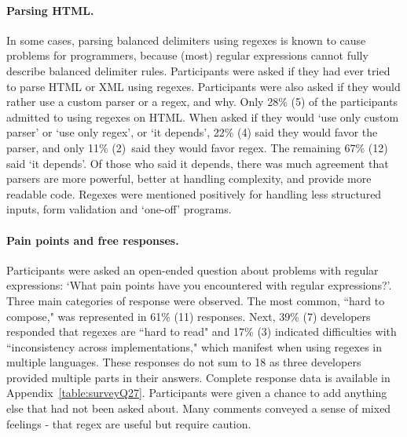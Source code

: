 \paragraph{Parsing HTML.}\label{sec:surveyParsingHTML}   In some cases, parsing balanced delimiters using regexes is known to cause problems for programmers, because (most) regular expressions cannot fully describe balanced delimiter rules. Participants were asked if they had ever tried to parse HTML or XML using regexes.  Participants were also asked if they would rather use a custom parser or a regex, and why.  Only 28\% (5) of the participants admitted to using regexes on HTML.  When asked if they would `use only custom parser' or `use only regex', or `it depends', 22\% (4) said they would favor the parser, and only 11\% (2) said they would favor regex.  The remaining 67\% (12) said `it depends'.  Of those who said it depends, there was much agreement that parsers are more powerful, better at handling complexity, and provide more readable code.  Regexes were mentioned positively for handling less structured inputs, form validation and `one-off' programs.

\paragraph{Pain points and free responses.}\label{sec:painPoints}
Participants were asked an open-ended question about problems with regular expressions: `What pain points have you encountered with regular expressions?'.  Three main categories of response were observed. The most common, ``hard to compose," was represented in 61\% (11) responses. Next, 39\% (7) developers responded that regexes are ``hard to read" and 17\% (3) indicated difficulties with ``inconsistency across implementations," which manifest when using regexes in multiple languages. These responses do not sum to 18 as three developers provided multiple parts in their answers.  Complete response data is available in Appendix~\ref{table:surveyQ27}.  Participants were given a chance to add anything else that had not been asked about.  Many comments conveyed a sense of mixed feelings - that regex are useful but require caution.

